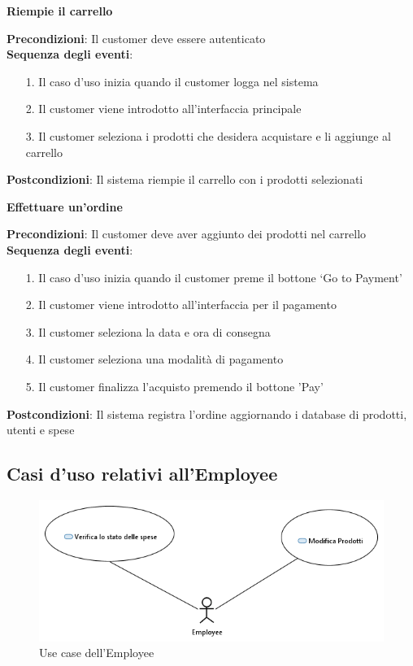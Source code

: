 \documentclass[12pt]{article}
\begin{document}
\clearpage


\textbf{Riempie il carrello}
\begin{tcolorbox}
\textbf{Precondizioni}: Il customer deve essere autenticato
\\
\textbf{Sequenza degli eventi}:
	\begin{enumerate}
	\item[1.] Il caso d’uso inizia quando il customer logga nel sistema
	\item[2.] Il customer viene introdotto all’interfaccia principale
 	\item[3.] Il customer seleziona i prodotti che desidera acquistare e li aggiunge al carrello
	\end{enumerate}
\textbf{Postcondizioni}: Il sistema riempie il carrello con i prodotti selezionati
\end{tcolorbox}



\textbf{Effettuare un'ordine}
\begin{tcolorbox}
\textbf{Precondizioni}: Il customer deve aver aggiunto dei prodotti nel carrello
\\
\textbf{Sequenza degli eventi}:
	\begin{enumerate}
	\item[1.] Il caso d’uso inizia quando il customer preme il bottone ‘Go to Payment’
	\item[2.] Il customer viene introdotto all’interfaccia per il pagamento
 	\item[3.] Il customer seleziona la data e ora di consegna
 	\item[4.] Il customer seleziona una modalità di pagamento
 	\item[5.] Il customer finalizza l’acquisto premendo il bottone 'Pay'
	\end{enumerate}
\textbf{Postcondizioni}: Il sistema registra l'ordine aggiornando i database di prodotti, utenti e spese
\end{tcolorbox}


\clearpage

\subsection{Casi d'uso relativi all'Employee}


\begin{figure}[h!]
	\begin{center}
 	 	\includegraphics[width=\textwidth,height=\textheight,keepaspectratio]{media/diagrams/use_case/employee.png}
  	 	 \caption{Use case dell'Employee}
	\end{center}
\end{figure}
\end{document}

